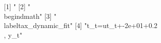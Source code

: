   [1] "%
  [2] "\\begin{dmath}"                                                                                                                                                                                                                                                                                                                                                                                                                                                                                                                                                                                                                               
  [3] "\\label{tax_dynamic_fit}"                                                                                                                                                                                                                                                                                                                                                                                                                                                                                                                                                                                                                     
  [4] "{t_{t}}={ut_{t}}+-2e+01+0.2\\, {y_{t}}"                                                                                                                                                                                                                                                                                                                                                                                                                                                                                                                                                                                                       

